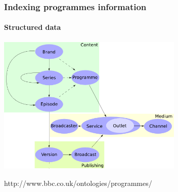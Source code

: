 \documentclass{beamer}
\begin{document}
\begin{frame}
  \frametitle{Indexing programmes information}
  \framesubtitle{Structured data}
  \centering
  \includegraphics[width=3.5in]{programmes_ontology.png}
  \begin{flushright}
    \tiny
    http://www.bbc.co.uk/ontologies/programmes/
  \end{flushright}
\end{frame}
\end{document}
